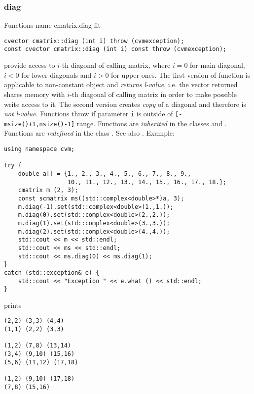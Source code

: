 \subsubsection{diag}
Functions%
\pdfdest name {cmatrix.diag} fit
\begin{verbatim}
cvector cmatrix::diag (int i) throw (cvmexception);
const cvector cmatrix::diag (int i) const throw (cvmexception);
\end{verbatim}
provide access to  \hbox{$i$-th} diagonal of calling matrix,
where $i=0$ for main diagonal, $i<0$ for lower diagonals 
and $i>0$ for upper ones.
The first version
of  function is applicable to  non-constant object and
\emph{returns  l-value}, i.e. the vector returned shares memory
with  \hbox{$i$-th} diagonal of calling matrix
in order to make possible write access to it.
The second version creates  \emph{copy} of a diagonal and therefore is
\emph{not  l-value}.
Functions throw 
if  parameter \verb"i" is outside of 
\verb"[-msize()+1,nsize()-1]" range.
Functions are \emph{inherited}
in the classes
 and .
Functions are \emph{redefined} in the class .
See also .
Example:
\begin{Verbatim}
using namespace cvm;

try {
    double a[] = {1., 2., 3., 4., 5., 6., 7., 8., 9., 
                  10., 11., 12., 13., 14., 15., 16., 17., 18.};
    cmatrix m (2, 3);
    const scmatrix ms((std::complex<double>*)a, 3);
    m.diag(-1).set(std::complex<double>(1.,1.));
    m.diag(0).set(std::complex<double>(2.,2.));
    m.diag(1).set(std::complex<double>(3.,3.));
    m.diag(2).set(std::complex<double>(4.,4.));
    std::cout << m << std::endl;
    std::cout << ms << std::endl;
    std::cout << ms.diag(0) << ms.diag(1);
}
catch (std::exception& e) {
    std::cout << "Exception " << e.what () << std::endl;
}
\end{Verbatim}
prints
\begin{Verbatim}
(2,2) (3,3) (4,4)
(1,1) (2,2) (3,3)

(1,2) (7,8) (13,14)
(3,4) (9,10) (15,16)
(5,6) (11,12) (17,18)

(1,2) (9,10) (17,18)
(7,8) (15,16)
\end{Verbatim}
\newpage



